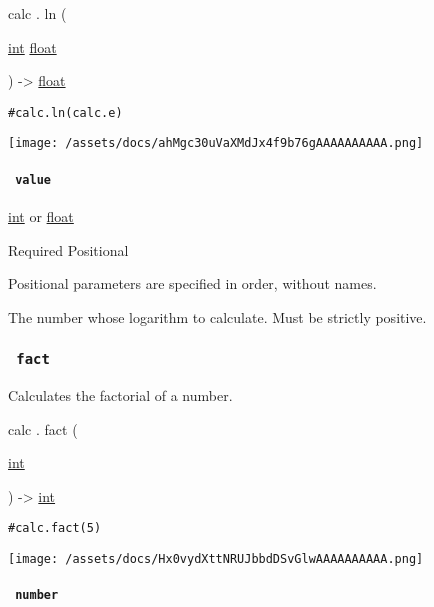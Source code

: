 calc { . } { ln } (

{ \href{/docs/reference/foundations/int/}{int}
\href{/docs/reference/foundations/float/}{float} }

) -\textgreater{} \href{/docs/reference/foundations/float/}{float}

\begin{verbatim}
#calc.ln(calc.e)
\end{verbatim}

\texttt{[image: /assets/docs/ahMgc30uVaXMdJx4f9b76gAAAAAAAAAA.png]}

\paragraph{\texorpdfstring{\texttt{\ value\ }}{ value }}\label{functions-ln-value}

\href{/docs/reference/foundations/int/}{int} {or}
\href{/docs/reference/foundations/float/}{float}

{Required} {{ Positional }}

\label{functions-ln-value-positional-tooltip}
Positional parameters are specified in order, without names.

The number whose logarithm to calculate. Must be strictly positive.

\subsubsection{\texorpdfstring{\texttt{\ fact\ }}{ fact }}\label{functions-fact}

Calculates the factorial of a number.

calc { . } { fact } (

{ \href{/docs/reference/foundations/int/}{int} }

) -\textgreater{} \href{/docs/reference/foundations/int/}{int}

\begin{verbatim}
#calc.fact(5)
\end{verbatim}

\texttt{[image: /assets/docs/Hx0vydXttNRUJbbdDSvGlwAAAAAAAAAA.png]}

\paragraph{\texorpdfstring{\texttt{\ number\ }}{ number }}\label{functions-fact-number}

